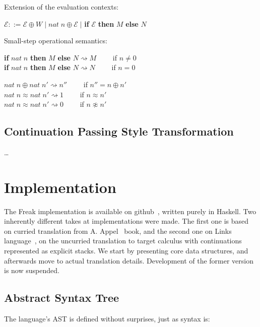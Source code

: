 \documentclass[declaration,shortabstract]{iithesis}
\theoremstyle{definition} \newtheorem{definition}{Definition}[chapter]
\theoremstyle{remark} \newtheorem{remark}[definition]{Observation}
\theoremstyle{plain} \newtheorem{theorem}[definition]{Theorem}
\theoremstyle{plain} \newtheorem{lemma}[definition]{Lemma}
\begin{document}
    \noindent
    Extension of the evaluation contexts:

    \noindent
    $\mathcal{E} ::= \mathcal{E} \oplus W \; | \; nat \; n \oplus \mathcal{E} \; |$ \textbf{if} $\mathcal{E}$ \textbf{then} $M$ \textbf{else} $N$

    \noindent
    Small-step operational semantics:

    \noindent
    \textbf{if} $nat \; n$ \textbf{then} $M$ \textbf{else} $N \rightsquigarrow M \quad \quad $ if $n \neq 0$ \\
    \textbf{if} $nat \; n$ \textbf{then} $M$ \textbf{else} $N \rightsquigarrow N \quad \quad $ if $n = 0$

    \noindent
    $nat \; n \oplus nat \; n' \rightsquigarrow n'' \quad \quad $    if $ n'' = n \oplus n' $ \\
    $nat \; n \approx nat \; n' \rightsquigarrow 1  \quad \quad $    \; if $ n \approx n' $ \\
    $nat \; n \approx nat \; n' \rightsquigarrow 0  \quad \quad $    \; if $ n \not\approx n' $

\section{Continuation Passing Style Transformation}
    \ldots

\chapter{Implementation}\label{chapter:implementation}

    The Freak implementation is available on github~\cite{freak}, written purely
    in Haskell. Two inherently different takes at implementations were made. The
    first one is based on curried translation from A. Appel~\cite{appel-continuations}
    book, and the second one on Links language~\cite{handlers-cps, handlers-cps-journal},
    on the uncurried translation to target calculus with continuations represented
    as explicit stacks. We start by presenting core data structures, and
    afterwards move to actual translation details. Development of the former
    version is now suspended.

    \section{Abstract Syntax Tree}\label{sec:implementation-ast}

    The language's AST is defined without surprises, just as syntax is:
\end{document}
